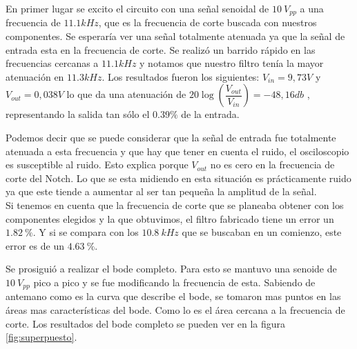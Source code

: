 En primer lugar se excito el circuito con una señal senoidal de $10 \ V_{pp}$ a una frecuencia de $11.1kHz$, que es la frecuencia de corte buscada con nuestros componentes. Se esperaría ver una señal totalmente atenuada ya que la señal de entrada esta en la frecuencia de corte. Se realizó un barrido rápido en las frecuencias cercanas a $11.1kHz$ y notamos que nuestro filtro tenía la mayor atenuación en $11.3kHz$. Los resultados fueron los siguientes: $V_{in}=9,73V$ y $V_{out}= 0,038V$ lo que da una atenuación de $20\log(\dfrac{V_{out}}{V_{in}}) = -48,16db$ , representando la salida tan sólo el $0.39 \%$ de la entrada. 

Podemos decir que se puede considerar que la señal de entrada fue totalmente atenuada a esta frecuencia y que
hay que tener en cuenta el ruido, el 
osciloscopio es susceptible al ruido. Esto explica porque $V_{out}$ no es cero en la frecuencia de corte del Notch. Lo que se esta midiendo en esta situación es prácticamente ruido ya que este tiende a aumentar al ser tan pequeña la amplitud de la señal. \\

Si tenemos en cuenta que la frecuencia de corte que se planeaba obtener con los componentes elegidos y la que obtuvimos, el filtro fabricado tiene un error un $1.82 \ \%$. Y si se compara con los $10.8 \ kHz$ que se buscaban en un comienzo, este error es de un $4.63 \ \%$.

Se prosiguió a realizar el bode completo. Para esto se mantuvo una senoide de $10 \ V_{pp}$ pico a pico
y se fue modificando la frecuencia de esta. Sabiendo de antemano como es la curva que 
describe el bode, se tomaron mas puntos en las áreas mas características del bode. Como lo es el área cercana a la frecuencia de corte. Los resultados del bode completo se pueden ver en la figura \ref{fig:superpuesto}.

